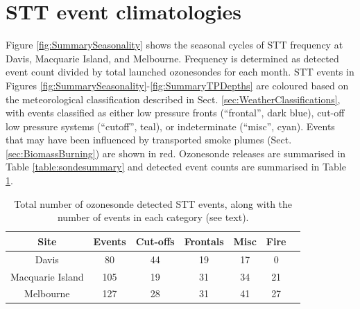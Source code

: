 \documentclass[acp, manuscript]{copernicus} %
\begin{document}
\section{STT event climatologies}
  \label{sec:eventclimatologies}
  Figure \ref{fig:SummarySeasonality} shows the seasonal cycles of STT frequency at Davis, Macquarie Island, and Melbourne.
  Frequency is determined as detected event count divided by total launched ozonesondes for each month.
  STT events in Figures \ref{fig:SummarySeasonality}-\ref{fig:SummaryTPDepths} are coloured based on the meteorological classification described in Sect. \ref{sec:WeatherClassifications}, with events classified as either low pressure fronts (“frontal”, dark blue), cut-off low pressure systems (“cutoff”, teal), or indeterminate (“misc”, cyan).
  Events that may have been influenced by transported smoke plumes (Sect. \ref{sec:BiomassBurning}) are shown in red.
  Ozonesonde releases are summarised in Table \ref{table:sondesummary} and detected event counts are summarised in Table \ref{table:EventCounts}.
  \begin{table}[t]
    \caption{Total number of ozonesonde detected STT events, along with the number of events in each category (see text).}
    \begin{tabular}{ c   c   c   c   c   c   c } 
      \hline
      Site & Events & Cut-offs & Frontals & Misc & Fire \\
      \hline
      Davis       	& 80 & 44  & 19 & 17 & 0 \\ 
      Macquarie Island 	& 105 & 19 & 31 & 34  & 21 \\
      Melbourne 	& 127 & 28 & 31 & 41 & 27 \\
      \hline
    \end{tabular}
    \label{table:EventCounts}
  \end{table}
\end{document}

